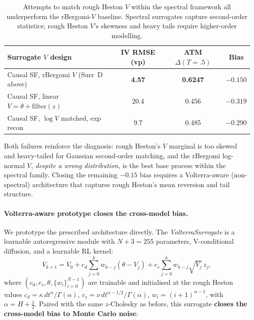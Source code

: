 \documentclass[11pt,a4paper]{article}
\begin{document}
\begin{table}[h]
\centering
\caption{Attempts to match rough Heston $V$ within the spectral framework
all underperform the rBergomi-$V$ baseline. Spectral surrogates capture
second-order statistics; rough Heston $V$'s skewness and heavy tails
require higher-order modelling.}
\label{tab:rh-negatives}
\begin{tabular}{lccc}
\toprule
Surrogate $V$ design & IV RMSE (vp) & ATM $\Delta(T=.5)$ & Bias \\
\midrule
Causal SF, rBergomi $V$ (Surr~D above)       & \textbf{4.57} & \textbf{0.6247} & \textbf{$-0.150$} \\
Causal SF, linear $V = \theta + \mathrm{filter}(z)$ & 20.4 & 0.456 & $-0.319$ \\
Causal SF, $\log V$ matched, exp recon       & 9.7 & 0.485 & $-0.290$ \\
\bottomrule
\end{tabular}
\end{table}

Both failures reinforce the diagnosis: rough Heston's $V$ marginal is
too skewed and heavy-tailed for Gaussian second-order matching, and the
rBergomi log-normal $V$, \emph{despite a wrong distribution}, is the
best base process within the spectral family. Closing the remaining
$-0.15$ bias requires a Volterra-aware (non-spectral) architecture
that captures rough Heston's mean reversion and tail structure.

\paragraph{Volterra-aware prototype closes the cross-model bias.}
We prototype the prescribed architecture directly. The
\emph{VolterraSurrogate} is a learnable autoregressive module with
$N+3 = 255$ parameters, V-conditional diffusion, and a learnable RL
kernel:
\begin{equation}
 V_{k+1}
  = V_0 + c_d \!\!\sum_{j=0}^{k}\! w_{k-j}(\theta - V_j)
     + c_s \!\!\sum_{j=0}^{k}\! w_{k-j}\sqrt{V_j}\,z_j,
 \label{eq:volterra-surrogate}
\end{equation}
where $(c_d, c_s, \theta, \{w_i\}_{i=0}^{N-1})$ are trainable and
initialised at the rough Heston values
$c_d = \kappa\,dt^\alpha/\Gamma(\alpha)$,
$c_s = \nu\,dt^{\alpha-1/2}/\Gamma(\alpha)$,
$w_i = (i+1)^{\alpha-1}$, with $\alpha = H + \tfrac{1}{2}$.
Paired with the same $z$-Cholesky as before, this surrogate
\textbf{closes the cross-model bias to Monte Carlo noise}:
\end{document}
